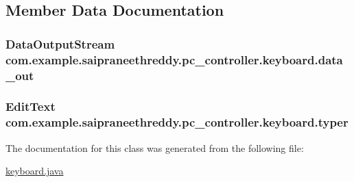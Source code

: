 \subsection{Member Data Documentation}
\subsubsection[{\texorpdfstring{data\+\_\+out}{data_out}}]{\setlength{\rightskip}{0pt plus 5cm}Data\+Output\+Stream com.\+example.\+saipraneethreddy.\+pc\+\_\+controller.\+keyboard.\+data\+\_\+out\hspace{0.3cm}{\ttfamily [package]}}\hypertarget{classcom_1_1example_1_1saipraneethreddy_1_1pc__controller_1_1keyboard_a8bc7a8e740b54025313de5b163a03dfc}{}\label{classcom_1_1example_1_1saipraneethreddy_1_1pc__controller_1_1keyboard_a8bc7a8e740b54025313de5b163a03dfc}
\subsubsection[{\texorpdfstring{typer}{typer}}]{\setlength{\rightskip}{0pt plus 5cm}Edit\+Text com.\+example.\+saipraneethreddy.\+pc\+\_\+controller.\+keyboard.\+typer\hspace{0.3cm}{\ttfamily [package]}}\hypertarget{classcom_1_1example_1_1saipraneethreddy_1_1pc__controller_1_1keyboard_a146b9bcadad110666d3ea2913d1305c6}{}\label{classcom_1_1example_1_1saipraneethreddy_1_1pc__controller_1_1keyboard_a146b9bcadad110666d3ea2913d1305c6}


The documentation for this class was generated from the following file\+:\begin{DoxyCompactItemize}
\item 
\hyperlink{keyboard_8java}{keyboard.\+java}\end{DoxyCompactItemize}
